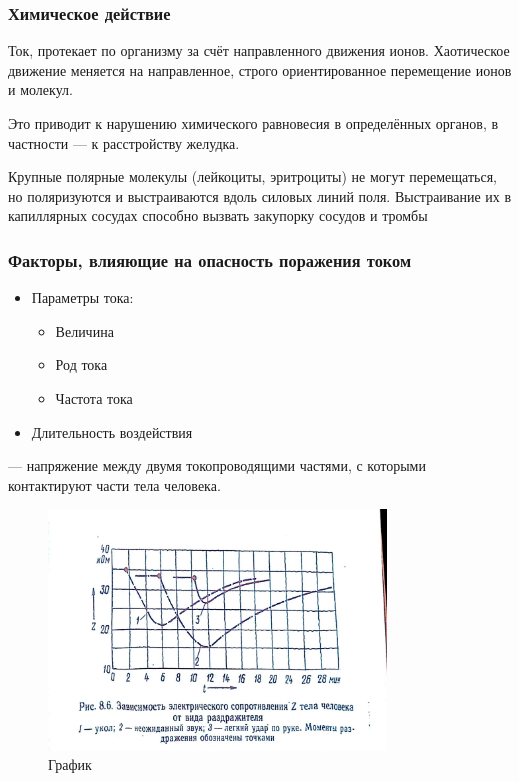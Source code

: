 \documentclass[a4paper, 14pt]{extarticle}
\begin{document}
\subsubsection{Химическое действие}
Ток, протекает по организму за счёт направленного движения ионов. Хаотическое движение меняется на направленное, строго ориентированное перемещение ионов и молекул. 

Это приводит к нарушению химического равновесия в определённых органов, в частности --- к расстройству желудка.

Крупные полярные молекулы (лейкоциты, эритроциты) не могут перемещаться, но поляризуются и выстраиваются вдоль силовых линий поля. Выстраивание их в капиллярных сосудах способно вызвать закупорку сосудов и тромбы

\subsubsection{Факторы, влияющие на опасность поражения током}
\begin{itemize}
    \item Параметры тока:
    \begin{itemize}
        \item Величина
        \item Род тока
        \item Частота тока
    \end{itemize}
    \item Длительность воздействия
\end{itemize}

 --- напряжение между двумя токопроводящими частями, с которыми контактируют части тела человека. 

\begin{figure}[h]
    \centering
    \includegraphics[width=0.8\textwidth]{./img/L2/S002.jpg}
    \caption{График}%
    \label{img:l2:2}
\end{figure}
\end{document}
